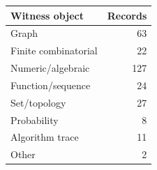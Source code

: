 \begin{tabular}{lr}
\toprule
Witness object & Records \\
\midrule
Graph & 63 \\
Finite combinatorial & 22 \\
Numeric/algebraic & 127 \\
Function/sequence & 24 \\
Set/topology & 27 \\
Probability & 8 \\
Algorithm trace & 11 \\
Other & 2 \\
\bottomrule
\end{tabular}
